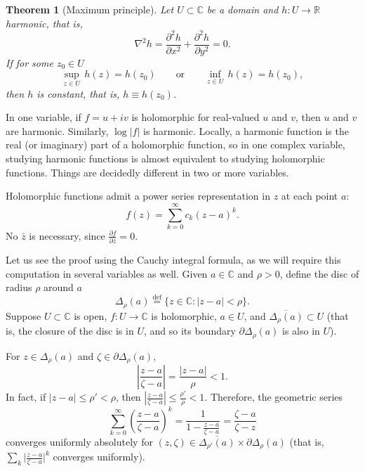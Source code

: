 \documentclass[12pt,openany]{book}
\newcommand{\sabs}[1]{\lvert {#1} \rvert}
\newcommand{\abs}[1]{\left\lvert {#1} \right\rvert}
\newcommand{\C}{{\mathbb{C}}}
\newcommand{\R}{{\mathbb{R}}}
\theoremstyle{plain}
\newtheorem{thm}{Theorem}[section]
\theoremstyle{remark}
\theoremstyle{definition}
\theoremstyle{exercise}
\theoremstyle{example}
\begin{document}
\begin{thm}[Maximum principle]
Let $U \subset \C$ be a domain and $h \colon U \to \R$
harmonic, that is,
%
\begin{equation*}
\nabla^2 h = \frac{\partial^2 h}{\partial x^2} + \frac{\partial^2 h}{\partial
y^2} = 0 .
\end{equation*}
If for some $z_0 \in U$
\begin{equation*}
\sup_{z \in U} \, h(z) = h(z_0)
\qquad \text{or} \qquad
\inf_{z \in U} \, h(z) = h(z_0) ,
\end{equation*}
then $h$ is constant, that is, $h \equiv h(z_0)$.
\end{thm}

In one variable, if $f = u+iv$ is holomorphic for real-valued $u$ and $v$,
then $u$ and $v$ are harmonic.
Similarly, $\log \sabs{f}$ is harmonic.
Locally, a harmonic function is
the real (or imaginary) part of a holomorphic function, so in
one complex variable, studying
harmonic functions is almost equivalent to studying holomorphic
functions.  Things are decidedly different
in two or more variables.

\medskip

Holomorphic functions admit a power series representation in $z$
at each point $a$:
\begin{equation*}
f(z) = \sum_{k=0}^\infty c_k {(z-a)}^k .
\end{equation*}
No $\bar{z}$ is necessary,
since $\frac{\partial f}{\partial \bar{z}} = 0$.

Let us see the proof using the Cauchy integral formula, as we will
require this computation in several variables as well.
Given $a \in \C$ and $\rho > 0$, define the disc of radius $\rho$ around $a$
%
\begin{equation*}
\Delta_\rho(a)
\overset{\text{def}}{=}
\bigl\{ z \in \C : \sabs{z-a} < \rho \bigr\} .
\end{equation*}
Suppose $U \subset \C$ is open, $f \colon U \to \C$ is holomorphic,
$a \in U$, and $\overline{\Delta_\rho(a)} \subset U$ (that is, the closure
of the disc is in $U$, and so its boundary $\partial \Delta_\rho(a)$ is also in $U$).

For $z \in \Delta_\rho(a)$ and $\zeta \in \partial \Delta_\rho(a)$,
\begin{equation*}
\abs{\frac{z-a}{\zeta-a}} =
\frac{\sabs{z-a}}{\rho} < 1 .
\end{equation*}
In fact, if $\sabs{z-a} \leq \rho' < \rho$, then
$\abs{\frac{z-a}{\zeta-a}} \leq \frac{\rho'}{\rho} < 1$.  Therefore,
the geometric series
\begin{equation*}
\sum_{k=0}^\infty
{\left(\frac{z-a}{\zeta-a}\right)}^k
=
\frac{1}{1-
\frac{z-a}{\zeta-a}}
=
\frac{\zeta-a}{\zeta-z}
\end{equation*}
converges uniformly absolutely for $(z,\zeta) \in \overline{\Delta_{\rho'}(a)}
\times \partial \Delta_\rho(a)$ (that is, $\sum_k {\bigl\lvert
\frac{z-a}{\zeta-a} \bigr\rvert}^k$
converges uniformly).
\end{document}
